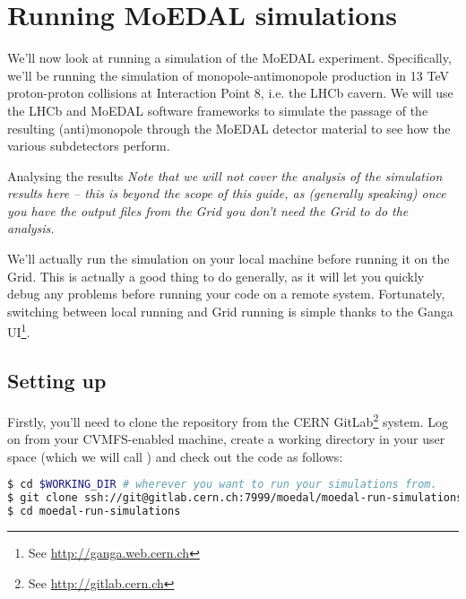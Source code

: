 \section{Running MoEDAL simulations}
\label{sec:sim}
We'll now look at running a simulation of the \ac{MoEDAL} experiment.
Specifically, we'll be running the simulation of
monopole-antimonopole production in 13 TeV proton-proton collisions
at Interaction Point 8, i.e. the \ac{LHCb} cavern.
We will use the \ac{LHCb} and \ac{MoEDAL} software frameworks to 
simulate the passage of the resulting (anti)monopole through the
\ac{MoEDAL} detector material to see how the various subdetectors perform.

\begin{infobox}{Analysing the results}
\emph{Note that we will not cover the analysis of the simulation results
here -- this is beyond the scope of this guide,
as (generally speaking) once you have the output files from the Grid
you don't need the Grid to do the analysis.}
\end{infobox}

We'll actually run the simulation on your local machine before running it
on the Grid.  This is actually a good thing to do generally,
as it will let you quickly debug any problems before running your code
on a remote system. Fortunately, switching between local running
and Grid running is simple thanks to the Ganga \ac{UI}\footnote{%
See \href{http://ganga.web.cern.ch}{http://ganga.web.cern.ch}}.

\subsection{Setting up}
\label{sec:moedalgridsetup}
Firstly, you'll need to clone the repository from the \ac{CERN}
GitLab\footnote{See \href{http://gitlab.cern.ch}{http://gitlab.cern.ch}}
system. Log on from your \ac{CVMFS}-enabled machine, create a working
directory in your user space (which we will call )
and check out the code as follows:

\begin{lstlisting}[gobble=0,numbers=none,language=bash]
$ cd $WORKING_DIR # wherever you want to run your simulations from.
$ git clone ssh://git@gitlab.cern.ch:7999/moedal/moedal-run-simulations.git
$ cd moedal-run-simulations
\end{lstlisting}

